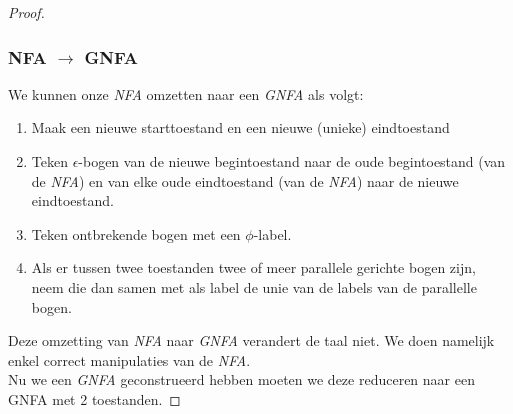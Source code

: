 \begin{proof}
\subsubsection*{NFA $\rightarrow$ GNFA}
We kunnen onze \emph{NFA} omzetten naar een \emph{GNFA} als volgt:
\begin{enumerate}
\item Maak een nieuwe starttoestand en een nieuwe (unieke) eindtoestand
\item Teken $\epsilon$-bogen van de nieuwe begintoestand naar de oude begintoestand (van de \emph{NFA}) en van elke oude eindtoestand (van de \emph{NFA}) naar de nieuwe eindtoestand.
\item Teken ontbrekende bogen met een $\phi$-label.
\item Als er tussen twee toestanden twee of meer parallele gerichte bogen zijn, neem die dan samen met als label de unie van de labels van de parallelle bogen.
\end{enumerate}
Deze omzetting van \emph{NFA} naar \emph{GNFA} verandert de taal niet. We doen namelijk enkel correct manipulaties van de \emph{NFA}.\\
Nu we een \emph{GNFA} geconstrueerd hebben moeten we deze reduceren naar een GNFA met 2 toestanden.


\end{proof}
